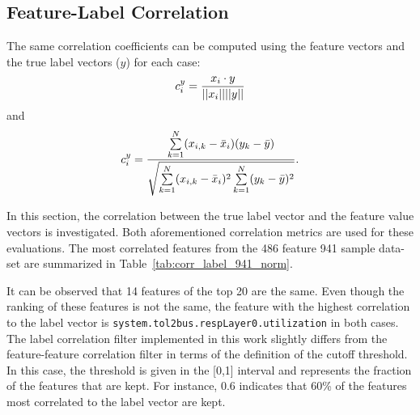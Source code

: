 \documentclass[paper=a4, fontsize=11pt]{scrartcl} %
\begin{document}
\subsection*{Feature-Label Correlation}

The same correlation coefficients can be computed using the feature vectors and the true label vectors ($y$) for each case: 
\begin{equation}
\small
c^y_{i}=\frac{x_i \cdot y}{||x_i||||y||}
\end{equation}
and
\begin{equation}
\small
c^y_{i} = \frac{\sum\limits_{k=1}^{N} (x_{i,k} - \bar{x}_i)(y_{k} - \bar{y})}
{\sqrt{\sum\limits_{k=1}^{N} (x_{i,k} - \bar{x}_i)^2 \sum\limits_{k=1}^{N} (y_{k} - \bar{y})^2}}.
\end{equation}

In this section, the correlation between the true label vector and the feature value vectors is investigated.
Both aforementioned correlation metrics are used for these evaluations.
The most correlated features from the 486 feature 941 sample data-set are summarized in Table~\ref{tab:corr_label_941_norm}.

It can be observed that 14 features of the top 20 are the same.
Even though the ranking of these features is not the same, the feature with the highest correlation to the label vector is \texttt{system.tol2bus.respLayer0.utilization} in both cases.
The label correlation filter implemented in this work slightly differs from the feature-feature correlation filter in terms of the definition of the cutoff threshold.
In this case, the threshold is given in the [0,1] interval and represents the fraction of the features that are kept.
For instance, 0.6 indicates that 60\% of the features most correlated to the label vector are kept. 
\end{document}
